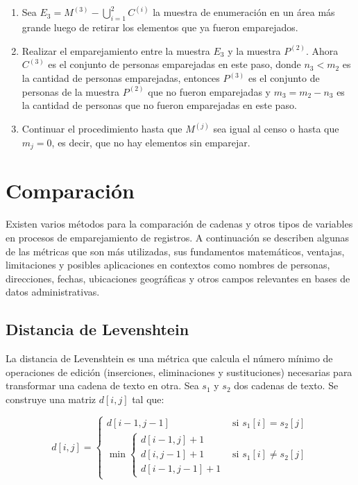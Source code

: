 \documentclass[
  12pt,
]{book}
\begin{document}
\begin{enumerate}
\item
  Sea \(E_3 = M^{(3)} - \bigcup_{i=1}^2C^{(i)}\) la muestra de enumeración en un área más grande luego de retirar los elementos que ya fueron emparejados.
\item
  Realizar el emparejamiento entre la muestra \(E_3\) y la muestra \(P^{(2)}\). Ahora \(C^{(3)}\) es el conjunto de personas emparejadas en este paso, donde \(n_3<m_2\) es la cantidad de personas emparejadas, entonces \(P^{(3)}\) es el conjunto de personas de la muestra \(P^{(2)}\) que no fueron emparejadas y \(m_3 = m_2 - n_3\) es la cantidad de personas que no fueron emparejadas en este paso.
\item
  Continuar el procedimiento hasta que \(M^{(j)}\) sea igual al censo o hasta que \(m_j=0\), es decir, que no hay elementos sin emparejar.
\end{enumerate}

\section{Comparación}\label{comparaciuxf3n}

Existen varios métodos para la comparación de cadenas y otros tipos de variables en procesos de emparejamiento de registros. A continuación se describen algunas de las métricas que son más utilizadas, sus fundamentos matemáticos, ventajas, limitaciones y posibles aplicaciones en contextos como nombres de personas, direcciones, fechas, ubicaciones geográficas y otros campos relevantes en bases de datos administrativas.

\subsection{Distancia de Levenshtein}\label{distancia-de-levenshtein}

La distancia de Levenshtein es una métrica que calcula el número mínimo de operaciones de edición (inserciones, eliminaciones y sustituciones) necesarias para transformar una cadena de texto en otra. Sea \(s_1\) y \(s_2\) dos cadenas de texto. Se construye una matriz \(d[i,j]\) tal que:

\[d[i, j] = 
\begin{cases}
d[i - 1, j - 1] & \text{si } s_1[i] = s_2[j] \\
\min \begin{cases}
d[i - 1, j] + 1 \\ 
d[i, j - 1] + 1 \\ 
d[i - 1, j - 1] + 1
\end{cases} & \text{si } s_1[i] \ne s_2[j]
\end{cases}
\]
\end{document}
